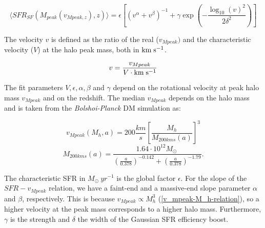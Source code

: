 \begin{equation}
    \langle SFR_{SF}(M_{peak}(v_{Mpeak, z}), z)\rangle = \epsilon \left[ \left( v^\alpha + v^\beta \right)^{-1} + \gamma \exp \left(-\frac{\log_{10}(v)^2}{2\delta^2}\right) \right]
\end{equation}

The velocity $v$ is defined as the ratio of the real ($v_{Mpeak})$ and the characteristic velocity ($V$) at the halo peak mass, both in $\rm{km} \;\rm{s}^{-1}$.

\begin{equation}
    v = \frac{v_{Mpeak}}{V \cdot \rm{km} \;\rm{s}^{-1}}
\end{equation}

The fit parameters $V, \epsilon, \alpha, \beta$ and  $\gamma$ depend on the rotational velocity at peak halo mass $v_{Mpeak}$ and on the redshift. The median $v_{Mpeak}$ depends on the halo mass and is taken from the \textit{Bolshoi-Planck} DM simulation as:

\begin{equation}
    v_{Mpeak}(M_h, a) = 200 \frac{km}{s}\left[ \frac{M_h}{M_{200kms}(a)}\right]^3
    \label{v_mpeak-M_h-relation}
\end{equation}
\begin{equation}
    M_{200kms}(a) = \frac{1.64 \cdot 10^{12} M_\odot\ }{(\frac{a}{0.378})^{-0.142}+(\frac{a}{0.378})^{-1.79}} .
\end{equation}

The characteristic SFR  in $M_\odot\ yr^{-1}$ is the global factor $\epsilon$. For the slope of the $SFR-v_{Mpeak}$ relation, we have a faint-end and a massive-end slope parameter $\alpha$ and $\beta$, respectively. This is because $v_{Mpeak} \propto M_h^3$ (\ref{v_mpeak-M_h-relation}), so a higher velocity at the peak mass corresponds to a higher halo mass.
Furthermore, $\gamma$ is the strength and $\delta$ the width of the Gaussian SFR efficiency boost. 



